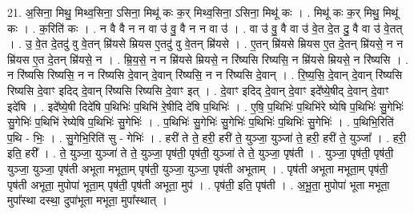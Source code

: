 \documentclass[17pt]{extarticle}
\begin{document}
21. अ॒सिना॒ मिथु॒ मिथ्व॒सिना॒ ऽसिना॒ मिथू॑ कः क॒र् मिथ्व॒सिना॒ ऽसिना॒ मिथू॑ कः । . मिथू॑ कः क॒र् मिथु॒ मिथू॑ कः । . क॒रिति॑ कः । . न वै वै न न वा उ॑ वु॒ वै न न वा उ॑ । . वा उ॑ वु॒ वै वा उ॑ वे॒त दे॒त दु॒ वै वा उ॑ वे॒तत् । . उ॒ वे॒त दे॒तदु॑ वु वे॒तन् म्रि॑यसे म्रियस ए॒तदु॑ वु वे॒तन् म्रि॑यसे । . ए॒तन् म्रि॑यसे म्रियस ए॒त दे॒तन् म्रि॑यसे॒ न न म्रि॑यस ए॒त दे॒तन् म्रि॑यसे॒ न । . म्रि॒य॒से॒ न न म्रि॑यसे म्रियसे॒ न रि॑ष्यसि रिष्यसि॒ न म्रि॑यसे म्रियसे॒ न रि॑ष्यसि । . न रि॑ष्यसि रिष्यसि॒ न न रि॑ष्यसि दे॒वान् दे॒वान् रि॑ष्यसि॒ न न रि॑ष्यसि दे॒वान् । . रि॒ष्य॒सि॒ दे॒वान् दे॒वान् रि॑ष्यसि रिष्यसि दे॒वाꣳ इदिद् दे॒वान् रि॑ष्यसि रिष्यसि दे॒वाꣳ इत् । . दे॒वाꣳ इदिद् दे॒वान् दे॒वाꣳ इदे᳚ष्ये॒षीद् दे॒वान् दे॒वाꣳ इदे॑षि । . इदे᳚ष्ये॒षी दिदे॑षि प॒थिभिः॑ प॒थिभि॑ रे॒षीदि दे॑षि प॒थिभिः॑ । . ए॒षि॒ प॒थिभिः॑ प॒थिभि॑रे ष्येषि प॒थिभिः॑ सु॒गेभिः॑ सु॒गेभिः॑ प॒थिभि॑ रेष्येषि प॒थिभिः॑ सु॒गेभिः॑ । . प॒थिभिः॑ सु॒गेभिः॑ सु॒गेभिः॑ प॒थिभिः॑ प॒थिभिः॑ सु॒गेभिः॑ । . प॒थिभि॒रिति॑ प॒थि - भिः॒ । . सु॒गेभि॒रिति॑ सु - गेभिः॑ । . हरी॑ ते ते॒ हरी॒ हरी॑ ते॒ युञ्जा॒ युञ्जा॑ ते॒ हरी॒ हरी॑ ते॒ युञ्जा᳚ । . हरी॒ इति॒ हरी᳚ । . ते॒ युञ्जा॒ युञ्जा॑ ते ते॒ युञ्जा॒ पृष॑ती॒ पृष॑ती॒ युञ्जा॑ ते ते॒ युञ्जा॒ पृष॑ती । . युञ्जा॒ पृष॑ती॒ पृष॑ती॒ युञ्जा॒ युञ्जा॒ पृष॑ती अभूता मभूता॒म् पृष॑ती॒ युञ्जा॒ युञ्जा॒ पृष॑ती अभूताम् । . पृष॑ती अभूता मभूता॒म् पृष॑ती॒ पृष॑ती अभूता॒ मुपोपा॑ भूता॒म् पृष॑ती॒ पृष॑ती अभूता॒ मुप॑ । . पृष॑ती॒ इति॒ पृष॑ती । . अ॒भू॒ता॒ मुपोपा॑ भूता मभूता॒ मुपा᳚स्था दस्था॒ दुपा॑भूता मभूता॒ मुपा᳚स्थात् । \newline
\end{document}
